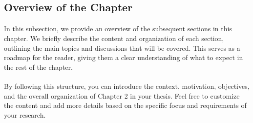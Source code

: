 \subsection{Overview of the Chapter}
\paragraph{}
In this subsection, we provide an overview of the subsequent sections in this chapter. We briefly describe the content and organization of each section, outlining the main topics and discussions that will be covered. This serves as a roadmap for the reader, giving them a clear understanding of what to expect in the rest of the chapter.
\paragraph{}
By following this structure, you can introduce the context, motivation, objectives, and the overall organization of Chapter 2 in your thesis. Feel free to customize the content and add more details based on the specific focus and requirements of your research.